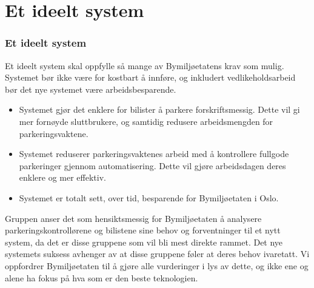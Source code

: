 \documentclass[xetex]{beamer}
\begin{document}
\begin{frame}\label{fr:ideelt_system}
	\section{Et ideelt system}
	\frametitle{Et ideelt system}
	Et ideelt system skal \alert{oppfylle så mange av Bymiljøetatens krav som mulig}. Systemet bør ikke være for kostbart å innføre, og inkludert vedlikeholdsarbeid bør det nye systemet være \alert{arbeidsbesparende}.
	
	\begin{itemize}
	\item Systemet gjør det \alert{enklere for bilister} å parkere forskriftsmessig. Dette vil gi mer fornøyde sluttbrukere, og samtidig redusere arbeidsmengden for parkeringsvaktene.
	\item Systemet \alert{reduserer parkeringsvaktenes arbeid} med å kontrollere fullgode parkeringer gjennom automatisering. Dette vil gjøre arbeidsdagen deres enklere og mer effektiv.
	\item Systemet er totalt sett, over tid, \alert{besparende} for Bymiljøetaten i Oslo.
	\end{itemize}

	Gruppen anser det som hensiktsmessig for Bymiljøetaten å analysere parkeringskontrollørene og bilistene sine behov og forventninger til et nytt system, da det er disse gruppene som vil bli mest direkte rammet. Det nye systemets suksess avhenger av at disse gruppene føler at deres behov ivaretatt. Vi oppfordrer Bymiljøetaten til å gjøre alle vurderinger i lys av dette, og ikke ene og alene ha fokus på hva som er den beste teknologien.
	

\end{frame}
\end{document}
